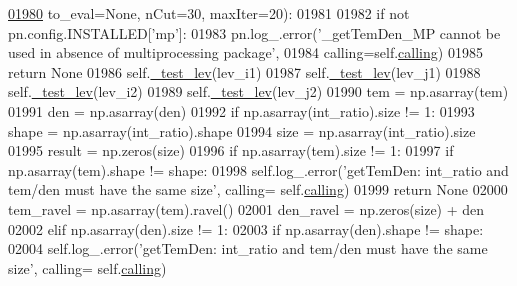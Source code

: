 \begin{DoxyCode}
\hypertarget{classpyneb_1_1core_1_1pynebcore_1_1_atom_l01980}{}\hyperlink{classpyneb_1_1core_1_1pynebcore_1_1_atom_a3a7c4f43d58a5988d04cbe23ed9593ba}{01980}                   to\_eval=\textcolor{keywordtype}{None}, nCut=30, maxIter=20):
01981         
01982         \textcolor{keywordflow}{if} \textcolor{keywordflow}{not} pn.config.INSTALLED[\textcolor{stringliteral}{'mp'}]:
01983             pn.log\_.error(\textcolor{stringliteral}{'\_getTemDen\_MP cannot be used in absence of multiprocessing package'},
01984                           calling=self.\hyperlink{classpyneb_1_1core_1_1pynebcore_1_1_atom_a373b7735acf4f528b54bddf373ad67a1}{calling})
01985             \textcolor{keywordflow}{return} \textcolor{keywordtype}{None}
01986         self.\hyperlink{classpyneb_1_1core_1_1pynebcore_1_1_atom_ade3de73e8bdb814d01d2d9af98eba87f}{\_test\_lev}(lev\_i1)
01987         self.\hyperlink{classpyneb_1_1core_1_1pynebcore_1_1_atom_ade3de73e8bdb814d01d2d9af98eba87f}{\_test\_lev}(lev\_j1)
01988         self.\hyperlink{classpyneb_1_1core_1_1pynebcore_1_1_atom_ade3de73e8bdb814d01d2d9af98eba87f}{\_test\_lev}(lev\_i2)
01989         self.\hyperlink{classpyneb_1_1core_1_1pynebcore_1_1_atom_ade3de73e8bdb814d01d2d9af98eba87f}{\_test\_lev}(lev\_j2)
01990         tem = np.asarray(tem)
01991         den = np.asarray(den)
01992         \textcolor{keywordflow}{if} np.asarray(int\_ratio).size != 1:
01993             shape = np.asarray(int\_ratio).shape
01994             size = np.asarray(int\_ratio).size
01995             result = np.zeros(size) 
01996             \textcolor{keywordflow}{if} np.asarray(tem).size != 1:
01997                 \textcolor{keywordflow}{if} np.asarray(tem).shape != shape:
01998                     self.log\_.error(\textcolor{stringliteral}{'getTemDen: int\_ratio and tem/den must have the same size'}, calling=
      self.\hyperlink{classpyneb_1_1core_1_1pynebcore_1_1_atom_a373b7735acf4f528b54bddf373ad67a1}{calling})
01999                     \textcolor{keywordflow}{return} \textcolor{keywordtype}{None}
02000                 tem\_ravel = np.asarray(tem).ravel()
02001                 den\_ravel = np.zeros(size) + den
02002             \textcolor{keywordflow}{elif} np.asarray(den).size != 1:
02003                 \textcolor{keywordflow}{if} np.asarray(den).shape != shape:
02004                     self.log\_.error(\textcolor{stringliteral}{'getTemDen: int\_ratio and tem/den must have the same size'}, calling=
      self.\hyperlink{classpyneb_1_1core_1_1pynebcore_1_1_atom_a373b7735acf4f528b54bddf373ad67a1}{calling})

\end{DoxyCode}
